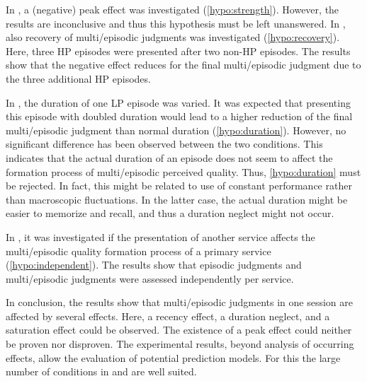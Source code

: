 In , a (negative) peak effect was investigated (\autoref{hypo:strength}).
However, the results are inconclusive and thus this hypothesis must be left unanswered.
In , also recovery of multi\-/episodic judgments was investigated (\autoref{hypo:recovery}).
Here, three \ac{HP} episodes were presented after two non-\ac{HP} episodes.
The results show that the negative effect reduces for the final multi\-/episodic judgment due to the three additional \ac{HP} episodes.

In , the duration of one \ac{LP} episode was varied.
It was expected that presenting this episode with doubled duration would lead to a higher reduction of the final multi\-/episodic judgment than normal duration (\autoref{hypo:duration}).
However, no significant difference has been observed between the two conditions.
This indicates that the actual duration of an episode does not seem to affect the formation process of multi\-/episodic perceived quality.
Thus, \autoref{hypo:duration} must be rejected.
In fact, this might be related to use of constant performance rather than macroscopic fluctuations.
In the latter case, the actual duration might be easier to memorize and recall, and thus a duration neglect might not occur.

In \EIIb{}, it was investigated if the presentation of another service affects the multi\-/episodic quality formation process of a primary service (\autoref{hypo:independent}).
The results show that episodic judgments and multi\-/episodic judgments were assessed independently per service.

In conclusion, the results show that multi\-/episodic judgments in one session are affected by several effects.
Here, a recency effect, a duration neglect, and a saturation effect could be observed.
The existence of a peak effect could neither be proven nor disproven.
The experimental results, beyond analysis of occurring effects, allow the evaluation of potential prediction models.
For this the large number of conditions in  and \EIIa{} are well suited.
